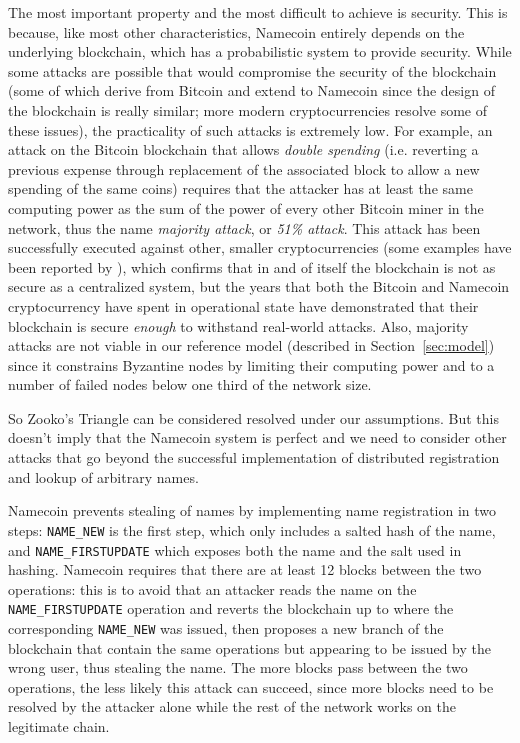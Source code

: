 \documentclass[mscthesis]{usiinfthesis}
\begin{document}
The most important property and the most difficult to achieve is security. This is because, like most other characteristics, Namecoin entirely depends on the underlying blockchain, which has a probabilistic system to provide security. While some attacks are possible that would compromise the security of the blockchain (some of which derive from Bitcoin and extend to Namecoin since the design of the blockchain is really similar; more modern cryptocurrencies resolve some of these issues), the practicality of such attacks is extremely low. For example, an attack on the Bitcoin blockchain that allows \emph{double spending} (i.e. reverting a previous expense through replacement of the associated block to allow a new spending of the same coins) requires that the attacker has at least the same computing power as the sum of the power of every other Bitcoin miner in the network, thus the name \emph{majority attack}, or \emph{51\% attack}. This attack has been successfully executed against other, smaller cryptocurrencies (some examples have been reported by \cite{website:realwordmajorityattacks}), which confirms that in and of itself the blockchain is not as secure as a centralized system, but the years that both the Bitcoin and Namecoin cryptocurrency have spent in operational state have demonstrated that their blockchain is secure \emph{enough} to withstand real-world attacks. Also, majority attacks are not viable in our reference model (described in Section~\ref{sec:model}) since it constrains Byzantine nodes by limiting their computing power and to a number of failed nodes below one third of the network size.

So Zooko's Triangle can be considered resolved under our assumptions. But this doesn't imply that the Namecoin system is perfect and we need to consider other attacks that go beyond the successful implementation of distributed registration and lookup of arbitrary names.

Namecoin prevents stealing of names by implementing name registration in two steps: \texttt{NAME\_NEW} is the first step, which only includes a salted hash of the name, and \texttt{NAME\_FIRSTUPDATE} which exposes both the name and the salt used in hashing. Namecoin requires that there are at least 12 blocks between the two operations: this is to avoid that an attacker reads the name on the \texttt{NAME\_FIRSTUPDATE} operation and reverts the blockchain up to where the corresponding \texttt{NAME\_NEW} was issued, then proposes a new branch of the blockchain that contain the same operations but appearing to be issued by the wrong user, thus stealing the name. The more blocks pass between the two operations, the less likely this attack can succeed, since more blocks need to be resolved by the attacker alone while the rest of the network works on the legitimate chain.
\end{document}
